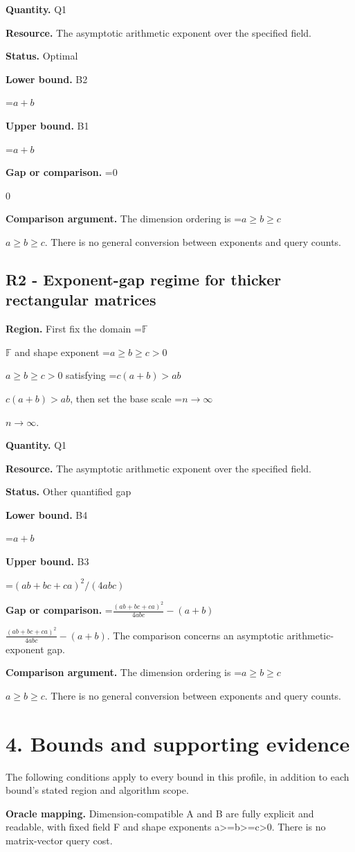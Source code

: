 \documentclass[10pt,a4paper]{article}
\newcommand{\AtlasMath}[1]{\par\begingroup\centering\setbox0=\hbox{$\displaystyle #1$}\ifdim\wd0>1.4\linewidth\typeout{ATLAS WIDE FORMULA: \the\wd0}\fi\ifdim\wd0>\linewidth\resizebox{\linewidth}{!}{\box0}\else\box0\fi\par\endgroup}
\newcommand{\AtlasInlineMath}[1]{\begingroup\setbox0=\hbox{$#1$}\ifdim\wd0>.4\linewidth\endgroup\AtlasMath{#1}\else\endgroup$#1$\fi}
\begin{document}
\textbf{Quantity.} Q1

\textbf{Resource.} The asymptotic arithmetic exponent over the specified field.

\textbf{Status.} Optimal

\textbf{Lower bound.} B2

\AtlasMath{a+b}
\textbf{Upper bound.} B1

\AtlasMath{a+b}
\textbf{Gap or comparison.} \AtlasInlineMath{0}

\textbf{Comparison argument.} The dimension ordering is \AtlasInlineMath{a\ge b\ge c}. There is no general conversion between exponents and query counts.

\subsection{R2 - Exponent-gap regime for thicker rectangular matrices}
\textbf{Region.} First fix the domain \AtlasInlineMath{\mathbb{F}} and shape exponent \AtlasInlineMath{a\ge b\ge c>0} satisfying \AtlasInlineMath{c(a+b)>ab}, then set the base scale \AtlasInlineMath{n\to\infty}.

\textbf{Quantity.} Q1

\textbf{Resource.} The asymptotic arithmetic exponent over the specified field.

\textbf{Status.} Other quantified gap

\textbf{Lower bound.} B4

\AtlasMath{a+b}
\textbf{Upper bound.} B3

\AtlasMath{(ab+bc+ca)^2/(4abc)}
\textbf{Gap or comparison.} \AtlasInlineMath{\frac{(ab+bc+ca)^2}{4abc}-(a+b)}. The comparison concerns an asymptotic arithmetic-exponent gap.

\textbf{Comparison argument.} The dimension ordering is \AtlasInlineMath{a\ge b\ge c}. There is no general conversion between exponents and query counts.

\section{4. Bounds and supporting evidence}
The following conditions apply to every bound in this profile, in addition to each bound's stated region and algorithm scope.

\textbf{Oracle mapping.} Dimension-compatible A and B are fully explicit and readable, with fixed field F and shape exponents a>=b>=c>0. There is no matrix-vector query cost.
\end{document}

